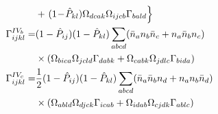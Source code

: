 \documentclass[11pt]{article}
\newcommand{\MyRomanNum}[1]{%
\ifcase#1\or I\or II\or III\or IV\or V\or VI\or VII\or VIII\or IX\or X\else #1\fi}
\begin{document}
\begin{subequations}
\begin{align}
&+ \left.  (1 \!-\! \hat P_{kl} )  \Omega_{dcak} \Omega_{ijcb} \Gamma_{bald} \right\}\\
\Gamma^{\MyRomanNum{4}_b}_{ijkl}  =&  (1 - \hat P_{ij} ) (1 - \hat P_{kl} ) \sum_{abcd} (   \bar{n}_a {n}_b \bar{n}_c +  {n}_a  \bar{n}_b  {n}_c )   \nonumber\\
& \times \left(\Omega_{bica} \Omega_{jcld} \Gamma_{dabk}  + \Omega_{cabk} \Omega_{jdlc} \Gamma_{bida} \right)\\
\Gamma^{\MyRomanNum{4}_c}_{ijkl} =&   \frac{1}{2} (1 - \hat P_{ij} ) (1 - \hat P_{kl}) \sum_{abcd} (   \bar{n}_a \bar{n}_b {n}_d +{n}_a  {n}_b  \bar{n}_d ) \nonumber \\
&\times \left( \Omega_{abld} \Omega_{djck} \Gamma_{icab}  +\Omega_{idab} \Omega_{cjdk} \Gamma_{ablc}   \right)
\end{align}
\end{subequations}
\end{document}
